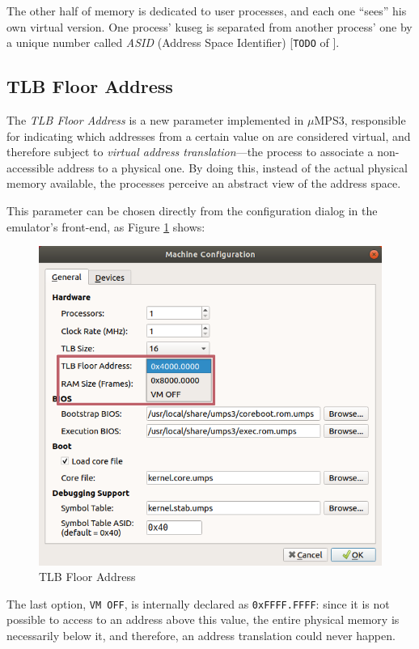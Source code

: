 \documentclass[12pt,a4paper,openright,twoside]{report}
\begin{document}
The other half of memory is dedicated to user processes, and each one ``sees'' his own virtual version.
One process' kuseg is separated from another process' one by a unique number called \textit{ASID} (Address Space Identifier) [\texttt{TODO} of \cite{pops}].

\subsection{TLB Floor Address}
\label{chap:tlb_floor_address}
The \textit{TLB Floor Address} is a new parameter implemented in $\mu$MPS3, responsible for indicating which addresses from a certain value on are considered virtual, and therefore subject to \textit{virtual address translation}---the process to associate a non-accessible address to a physical one.
By doing this, instead of the actual physical memory available, the processes perceive an abstract view of the address space.

This parameter can be chosen directly from the configuration dialog in the emulator's front-end, as Figure \ref{fig:tlb_floor_address} shows:
\begin{figure}[h]
	\centering
	\includegraphics[scale=0.68]{tlb_floor_address}
	\caption{TLB Floor Address}
	\label{fig:tlb_floor_address}
\end{figure}

The last option, \texttt{VM OFF}, is internally declared as \texttt{0xFFFF.FFFF}: since it is not possible to access to an address above this value, the entire physical memory is necessarily below it, and therefore, an address translation could never happen.
\end{document}
